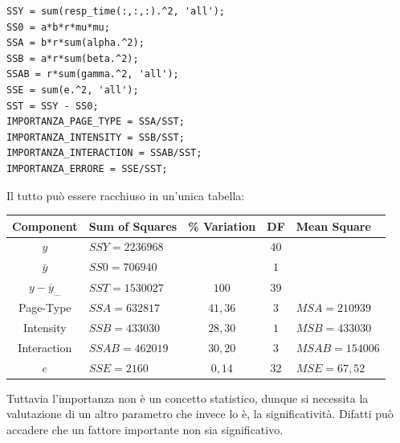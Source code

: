 \begin{verbatim}
SSY = sum(resp_time(:,:,:).^2, 'all');
SS0 = a*b*r*mu*mu;
SSA = b*r*sum(alpha.^2);
SSB = a*r*sum(beta.^2);
SSAB = r*sum(gamma.^2, 'all');
SSE = sum(e.^2, 'all');
SST = SSY - SS0;
IMPORTANZA_PAGE_TYPE = SSA/SST;
IMPORTANZA_INTENSITY = SSB/SST;
IMPORTANZA_INTERACTION = SSAB/SST;
IMPORTANZA_ERRORE = SSE/SST;
\end{verbatim}
Il tutto può essere racchiuso in un'unica tabella:
\begin{table}[H]
	\begin{center}
		\begin{tabular}{|c|l|c|c|l|}
			\hline
		\textbf{Component} & \textbf{Sum of Squares} & \textbf{\% Variation} & \textbf{DF} & \textbf{Mean Square} \\
		\hline
		$y$ & $SSY=2236968$ & & $40$ &  \\
		$\bar{y}$ & $SS0 = 706940$ & & $1$ & \\
		$y-\overline{y}_{...}$ & $SST = 1530027$ & $100$ & $39$ & \\
		Page-Type & $SSA = 632817$ & $41,36$ & $3$ & $MSA = 210939$ \\
		Intensity & $SSB = 433030$ & $28,30$ & $1$ & $MSB = 433030$ \\
		Interaction & $SSAB = 462019$ & $30,20$ & $3$ & $MSAB = 154006$ \\
		$e$ & $SSE = 2160$ & $0,14$ & $32$ & $MSE = 67,52$ \\
		\hline
		\end{tabular}
	\end{center}
\end{table}
Tuttavia l'importanza non è un concetto statistico, dunque si necessita la valutazione di un altro parametro che invece lo è, la significatività.
Difatti può accadere che un fattore importante non sia significativo.
